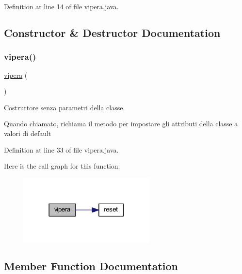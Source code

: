 Definition at line 14 of file vipera.\+java.



\subsection{Constructor \& Destructor Documentation}
\mbox{\label{class_snake_1_1game_1_1vipera_1_1vipera_abc78413b68a8d6a8a17953932195b06f}} 
\subsubsection{\texorpdfstring{vipera()}{vipera()}}
{\footnotesize\ttfamily \mbox{\hyperlink{class_snake_1_1game_1_1vipera_1_1vipera}{vipera}} (\begin{DoxyParamCaption}{ }\end{DoxyParamCaption})}



Costruttore senza parametri della classe. 

Quando chiamato, richiama il metodo per impostare gli attributi della classe a valori di default 

Definition at line 33 of file vipera.\+java.

Here is the call graph for this function\+:
\nopagebreak
\begin{figure}[H]
\begin{center}
\leavevmode
\includegraphics[width=195pt]{class_snake_1_1game_1_1vipera_1_1vipera_abc78413b68a8d6a8a17953932195b06f_cgraph}
\end{center}
\end{figure}


\subsection{Member Function Documentation}
\mbox{\label{class_snake_1_1game_1_1vipera_1_1vipera_aca08d818f8eb2849ca337ea2c64f344d}} 

